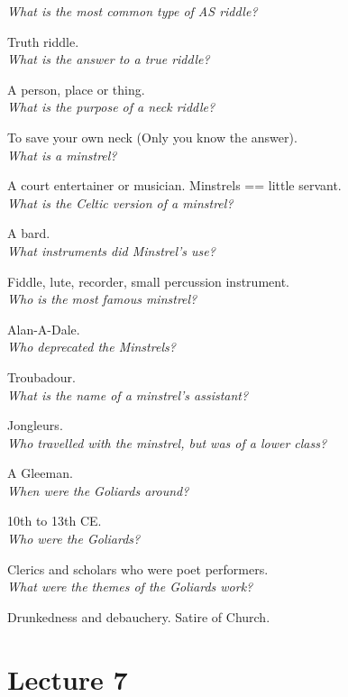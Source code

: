 \documentclass[12pt]{article}
\begin{document}
\textit{What is the most common type of AS riddle?}

Truth riddle.\\

\textit{What is the answer to a true riddle?}

A person, place or thing.\\

\textit{What is the purpose of a neck riddle?}

To save your own neck (Only you know the answer).\\

\textit{What is a minstrel?}

A court entertainer or musician. Minstrels == little servant.\\

\textit{What is the Celtic version of a minstrel?}

A bard.\\ 

\textit{What instruments did Minstrel's use?}

Fiddle, lute, recorder, small percussion instrument.\\

\textit{Who is the most famous minstrel?}

Alan-A-Dale.\\

\textit{Who deprecated the Minstrels?}

Troubadour.\\

\textit{What is the name of a minstrel's assistant?}

Jongleurs.\\

\textit{Who travelled with the minstrel, but was of a lower class?}

A Gleeman.\\

\textit{When were the Goliards around?}

10th to 13th CE. \\

\textit{Who were the Goliards?}

Clerics and scholars who were poet performers. \\

\textit{What were the themes of the Goliards work?}

Drunkedness and debauchery. Satire of Church.\\

\section*{Lecture 7}
\end{document}

